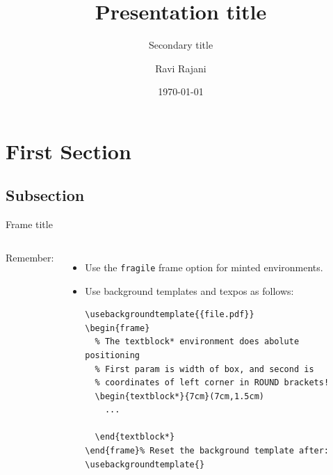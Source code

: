 \documentclass[handout,aspectratio=169,10pt]{beamer}
\title
{Presentation title}
\subtitle
{Secondary title}
\author
{Ravi Rajani}
\institute
{School of Computing and Communications}
\date{\today}
\def\innerframewidth{\dimexpr\paperwidth - 3cm\relax}
\begin{document}
\begin{frame}
  \titlepage
\end{frame}


\section{First Section}

\subsection{Subsection}

\begin{frame}[fragile]{Frame title}
  \begin{columns}
    \column{\innerframewidth}
    Remember:
    \begin{itemize}
      \item Use the \texttt{fragile} frame option for minted environments.
      \item Use background templates and texpos as follows:
            \begin{verbatim}
\usebackgroundtemplate{{file.pdf}}
\begin{frame}
  % The textblock* environment does abolute positioning
  % First param is width of box, and second is
  % coordinates of left corner in ROUND brackets!
  \begin{textblock*}{7cm}(7cm,1.5cm)
    ...
    
  \end{textblock*}
\end{frame}% Reset the background template after:
\usebackgroundtemplate{}

\end{verbatim}
    \end{itemize}
  \end{columns}
\end{frame}
\end{document}
